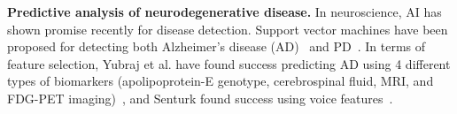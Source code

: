 
\vspace{1pt}
\noindent\textbf{Predictive analysis of neurodegenerative disease.}
In neuroscience, AI has shown promise recently for disease detection. Support vector machines have been proposed for detecting both Alzheimer’s disease (AD)~\cite{zhang2015detection} and PD~\cite{dinov2016predictive}.
In terms of feature selection, Yubraj et al. have found success predicting AD using 4 different types of biomarkers (apolipoprotein-E genotype, cerebrospinal fluid, MRI, and FDG-PET imaging)~\cite{10.3389/fncom.2019.00072}, and  
Senturk found success using voice features~\cite{KARAPINARSENTURK2020109603}.






